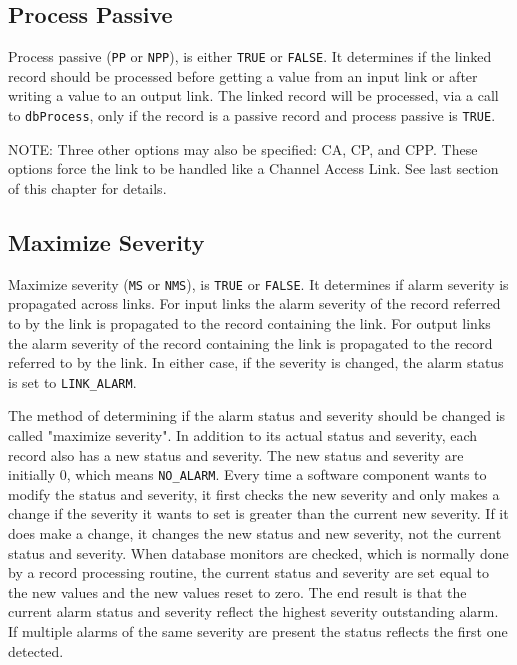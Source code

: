 \subsection{Process Passive}

Process passive (\verb|PP| or \verb|NPP|), is either \verb|TRUE| or \verb|FALSE|.  It determines if the linked record should be processed before 
getting a value from an input link or after writing a value to an output link. The linked record will be processed, via a call 
to \verb|dbProcess|, only if the record is a passive record and process passive is \verb|TRUE|.

NOTE: Three other options may also be specified: CA, CP, and CPP. These options force the link to be handled like a 
Channel Access Link. See last section of this chapter for details.

\subsection{Maximize Severity}

Maximize severity (\verb|MS| or \verb|NMS|), is \verb|TRUE| or \verb|FALSE|.  It determines if alarm severity is propagated across links. For input 
links the alarm severity of the record referred to by the link is propagated to the record containing the link. For output 
links the alarm severity of the record containing the link is propagated to the record referred to by the link. In either case, 
if the severity is changed, the alarm status is set to \verb|LINK_ALARM|.

The method of determining if the alarm status and severity should be changed is called "maximize severity". In addition 
to its actual status and severity, each record also has a new status and severity. The new status and severity are initially 0, 
which means \verb|NO_ALARM|. Every time a software component wants to modify the status and severity, it first checks the 
new severity and only makes a change if the severity it wants to set is greater than the current new severity. If it does make 
a change, it changes the new status and new severity, not the current status and severity. When database monitors are 
checked, which is normally done by a record processing routine, the current status and severity are set equal to the new 
values and the new values reset to zero. The end result is that the current alarm status and severity reflect the highest 
severity outstanding alarm. If multiple alarms of the same severity are present the status reflects the first one detected.

